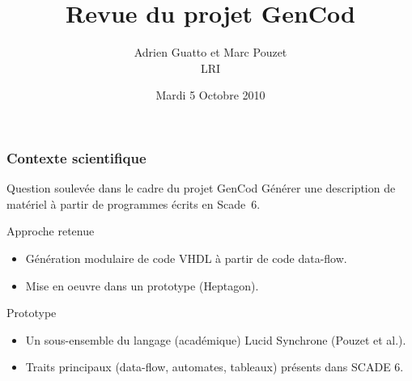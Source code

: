 \documentclass{beamer}
\title{Revue du projet GenCod}
\author{Adrien Guatto et Marc Pouzet\\
        LRI}
\date{Mardi 5 Octobre 2010}
\newcommand{\lucy}{{\sc Lucid Synchrone}}
\newcommand{\scadesix}{{\sc Scade~6}}
\newcommand{\heptagon}{{\sc Heptagon}}
\begin{document}

\begin{frame}[t,plain]
  \titlepage
\end{frame}

\begin{frame}
  \frametitle{Contexte scientifique}

  \begin{block}{Question soulevée dans le cadre du projet GenCod}
    Générer une description de matériel à partir de programmes écrits en
    \scadesix{}.
  \end{block}

  \begin{block}{Approche retenue}
    \begin{itemize}
    \item Génération modulaire de code VHDL à partir de code data-flow.
    \item Mise en oeuvre dans un prototype (\heptagon{}).
    \end{itemize}
  \end{block}

  \begin{block}{Prototype}
    \begin{itemize}
    \item Un sous-ensemble du langage (académique) \lucy{} (Pouzet et al.).
    \item Traits principaux (data-flow, automates, tableaux) pr\'esents dans
      SCADE 6.
    \end{itemize}
  \end{block}
\end{frame}
\end{document}

